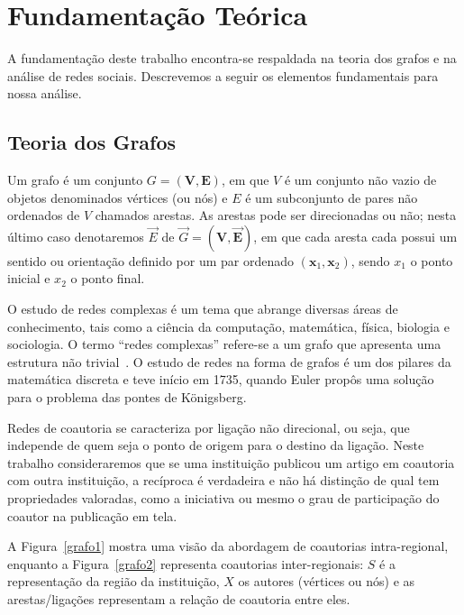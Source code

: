 \documentclass[12pt]{article}
\begin{document}
\section{Fundamentação Teórica}

A fundamentação deste trabalho encontra-se respaldada na teoria dos grafos e na análise de redes sociais. 
Descrevemos a seguir os elementos fundamentais para nossa análise.


\subsection{Teoria dos Grafos}

Um grafo é um conjunto $G = (\bm V,\bm E)$, em que $V$ é um conjunto não vazio de objetos denominados vértices (ou nós) e $E$ é um subconjunto de pares não ordenados de $V$ chamados arestas. 
As arestas pode ser direcionadas ou não; nesta último caso denotaremos $\Vec E$ de $\Vec G = (\bm V,\bm \Vec E)$, em que cada aresta cada possui um sentido ou orientação definido por um par ordenado $(\bm x_{1}, \bm x_{2})$, sendo $x_{1}$ o ponto inicial e $x_{2}$ o ponto final.

O estudo de redes complexas é um tema  que abrange diversas áreas de conhecimento, tais como a ciência da computação, matemática, física, biologia e sociologia. 
O termo ``redes complexas'' refere-se a um grafo que apresenta uma estrutura não trivial~\citep{barabasi2003everything}. 
O estudo de redes na forma de grafos é um dos pilares da matemática discreta e teve início em 1735, quando Euler propôs uma solução para o problema das pontes de Königsberg.

Redes de coautoria se caracteriza por ligação não direcional, ou seja, que independe de quem seja o ponto de origem para o destino da ligação.
Neste trabalho consideraremos que se uma instituição publicou um artigo em coautoria com outra instituição, a recíproca é verdadeira e não há distinção de qual tem propriedades valoradas, como a iniciativa ou mesmo o grau de participação do coautor na publicação em tela.

A Figura~\ref{grafo1} mostra uma visão da abordagem de coautorias intra-regional, enquanto a Figura~\ref{grafo2} representa coautorias inter-regionais: $S$ é a representação da região da instituição, $X$ os autores (vértices ou nós) e as arestas/ligações representam a relação de coautoria entre eles.
\end{document}
